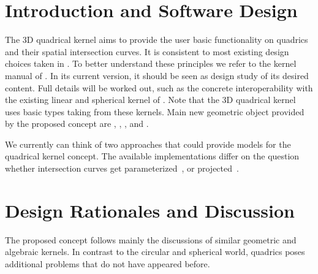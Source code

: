
\section{Introduction and Software Design}

The 3D quadrical kernel aims to provide the user basic functionality
on quadrics and their spatial intersection curves. It is 
consistent to most existing design choices taken in \cgal. To better
understand these principles we refer to the kernel manual of \cgal.
In its current version, it should be seen as design study of its desired
content. Full details will be worked out, such as the concrete
interoperability with the existing linear and spherical kernel of \cgal.
Note that the 3D quadrical kernel uses basic types taking 
from these kernels. Main new geometric object provided by the proposed
concept are , , ,
 and .

We currently can think of two approaches that
could provide models for the quadrical kernel concept.
The available 
implementations differ on the question whether intersection curves get 
parameterized~\cite{cgal:lazard04b}, 
or projected~\cite{cgal:bhksw-eceicpmqic-05}.



\section{Design Rationales and Discussion}

The proposed concept follows mainly the discussions of similar
geometric and algebraic kernels. In contrast to the circular
and spherical world, quadrics poses additional problems that do 
not have appeared before. 

